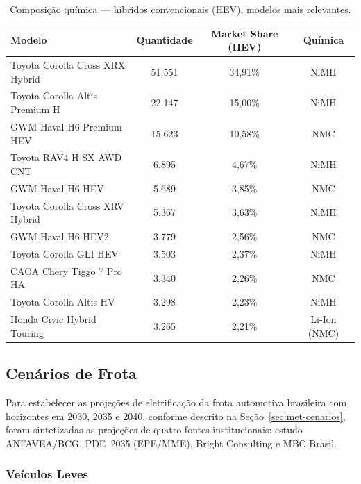 \begin{table}[H]
\centering
\caption{Composição química — híbridos convencionais (HEV), modelos mais
         relevantes.}
\label{tab:hev}
\begin{tabular}{lccc}
\toprule
\textbf{Modelo} & \textbf{Quantidade} & \textbf{Market Share (HEV)} & \textbf{Química} \\
\midrule
Toyota Corolla Cross XRX Hybrid & 51.551 & 34,91\% & NiMH \\
Toyota Corolla Altis Premium H  & 22.147 & 15,00\% & NiMH \\
GWM Haval H6 Premium HEV        & 15.623 & 10,58\% & NMC \\
Toyota RAV4 H SX AWD CNT        &  6.895 &  4,67\% & NiMH \\
GWM Haval H6 HEV                &  5.689 &  3,85\% & NMC \\
Toyota Corolla Cross XRV Hybrid &  5.367 &  3,63\% & NiMH \\
GWM Haval H6 HEV2               &  3.779 &  2,56\% & NMC \\
Toyota Corolla GLI HEV          &  3.503 &  2,37\% & NiMH \\
CAOA Chery Tiggo 7 Pro HA       &  3.340 &  2,26\% & NMC \\
Toyota Corolla Altis HV         &  3.298 &  2,23\% & NiMH \\
Honda Civic Hybrid Touring      &  3.265 &  2,21\% & Li-Ion (NMC) \\
\bottomrule
\end{tabular}
\end{table}

\subsection{Cenários de Frota}
\label{sec:cenarios-frota}

Para estabelecer as projeções de eletrificação da frota automotiva brasileira com
horizontes em 2030, 2035 e 2040, conforme descrito na
Seção~\ref{sec:met-cenarios}, foram sintetizadas as projeções de quatro fontes
institucionais: estudo ANFAVEA/BCG, PDE~2035 (EPE/MME), Bright Consulting e MBC
Brasil.

\subsubsection{Veículos Leves}
\label{subsec:leves}

